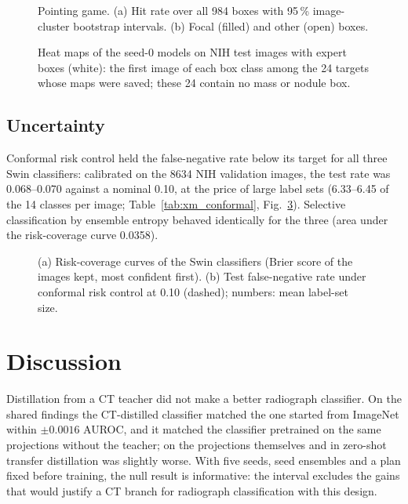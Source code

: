 \begin{figure}[htbp]
\centering
{}
\caption{Pointing game. (a) Hit rate over all 984 boxes with 95\,\% image-cluster bootstrap intervals. (b) Focal (filled) and other
(open) boxes.}
\label{fig:xm_pointing}
\end{figure}

\begin{figure}[htbp]
\centering
{}
\caption{Heat maps of the seed-0 models on NIH test images with expert boxes (white): the first image of each box class among the 24
targets whose maps were saved; these 24 contain no mass or nodule box.}
\label{fig:xm_xai}
\end{figure}

\subsection{Uncertainty}
\label{sec:xm_res_uq}
Conformal risk control held the false-negative rate below its target for all three Swin classifiers: calibrated on the \num{8634} NIH
validation images, the test rate was 0.068--0.070 against a nominal 0.10, at the price of large label sets (6.33--6.45 of the 14 classes
per image; Table~\ref{tab:xm_conformal}, Fig.~\ref{fig:xm_conformal}). Selective classification by ensemble entropy behaved identically
for the three (area under the risk-coverage curve 0.0358).

\begin{table}[htbp]
\centering\small
\caption{Conformal risk control of the per-image false-negative rate at 0.10 on the NIH test split and selective classification by
$1-$entropy (descriptive).}
\label{tab:xm_conformal}
\end{table}

\begin{figure}[htbp]
\centering
{}
\caption{(a) Risk-coverage curves of the Swin classifiers (Brier score of the images kept, most confident first). (b) Test false-negative
rate under conformal risk control at 0.10 (dashed); numbers: mean label-set size.}
\label{fig:xm_conformal}
\end{figure}

\section{Discussion}
\label{sec:xm_discussion}
Distillation from a CT teacher did not make a better radiograph classifier. On the shared findings the CT-distilled classifier matched
the one started from ImageNet within $\pm0.0016$ AUROC, and it matched the classifier pretrained on the same projections without the
teacher; on the projections themselves and in zero-shot transfer distillation was slightly worse. With five seeds, seed ensembles and a
plan fixed before training, the null result is informative: the interval excludes the gains that would justify a CT branch for
radiograph classification with this design.

